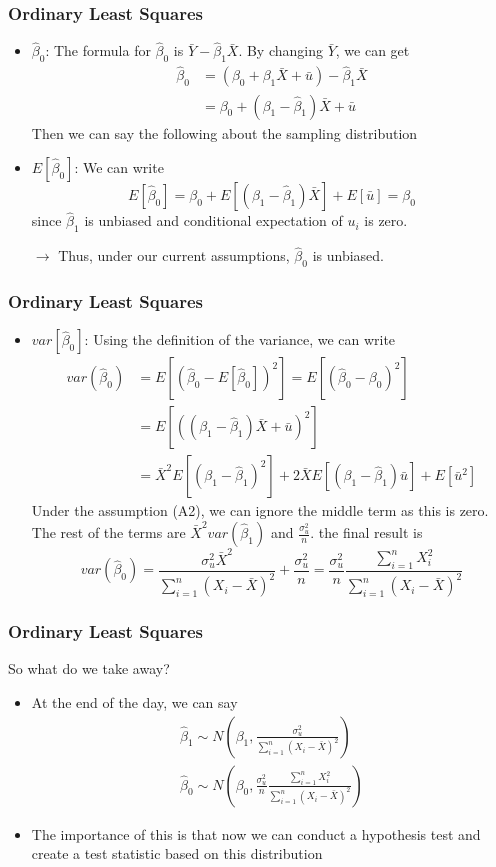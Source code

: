 \documentclass[compress]{beamer}
\begin{document}
\begin{frame}
\frametitle{Ordinary Least Squares}
\begin{itemize}
\item $\hat{\beta}_0$: The formula for $\hat{\beta}_0$ is $\bar{Y}-\hat{\beta}_1\bar{X}$. By changing $\bar{Y}$, we can get
\[
\begin{aligned}
\hat{\beta}_0&=(\beta_0+\beta_1\bar{X}+\bar{u})-\hat{\beta}_1\bar{X}\\
&=\beta_0+(\beta_1-\hat{\beta}_1)\bar{X}+\bar{u}
\end{aligned}
\]
Then we can say the following about the sampling distribution
\item $E[\hat{\beta}_0]$: We can write
\[
E[\hat{\beta}_0]=\beta_0+E[(\beta_1-\hat{\beta}_1)\bar{X}]+E[\bar{u}]=\beta_0
\]
since $\hat{\beta}_1$ is unbiased and conditional expectation of $u_i$ is zero. 
\item[$\to$]Thus, under our current assumptions, $\hat{\beta}_0$ is unbiased. 
\end{itemize}
\end{frame}

\begin{frame}
\frametitle{Ordinary Least Squares}
\begin{itemize}
\item $var[\hat{\beta}_0]$: Using the definition of the variance, we can write \[
\begin{aligned}
var(\hat{\beta}_0)&=E\left[\left(\hat{\beta}_0-E[\hat{\beta}_0]\right)^2\right] =E\left[\left(\hat{\beta}_0-{\beta}_0\right)^2\right]\\
&=E\left[\left( (\beta_1-\hat{\beta}_1)\bar{X}+\bar{u}\right)^2\right]\\
&=\bar{X}^2E\left[\left(\beta_1-\hat{\beta}_1 \right)^2\right]+ 2\bar{X}E\left[\left(\beta_1-\hat{\beta}_1 \right)\bar{u}\right] + E[\bar{u}^2]
\end{aligned}
\]
Under the assumption (A2), we can ignore the middle term as this is zero. The rest of the terms are $\bar{X}^2 var(\hat{\beta}_1)$ and $\frac{\sigma_u^2}{n}$. the final result is
\[
var(\hat{\beta}_0)=\frac{\sigma_u^2\bar{X}^2}{\sum_{i=1}^n(X_i-\bar{X})^2}+\frac{\sigma_u^2}{n}= \frac{\sigma_u^2}{n}\frac{\sum_{i=1}^nX_i^2}{\sum_{i=1}^n(X_i-\bar{X})^2}
\]
\end{itemize}
\end{frame}

\begin{frame}
\frametitle{Ordinary Least Squares}
So what do we take away?
\begin{itemize}
\item At the end of the day, we can say
\begin{gather*}
 \hat{\beta}_1 \sim N\left(\beta_1, \frac{\sigma_u^2}{\sum_{i=1}^n(X_i-\bar{X})^2}\right) \\
\hat{\beta}_0 \sim N\left(\beta_0, \frac{\sigma_u^2}{n}\frac{\sum_{i=1}^nX_i^2}{\sum_{i=1}^n(X_i-\bar{X})^2}\right)
\end{gather*}
\item The importance of this is that now we can conduct a hypothesis test and create a test statistic based on this distribution
\end{itemize}
\end{frame}
\end{document}
